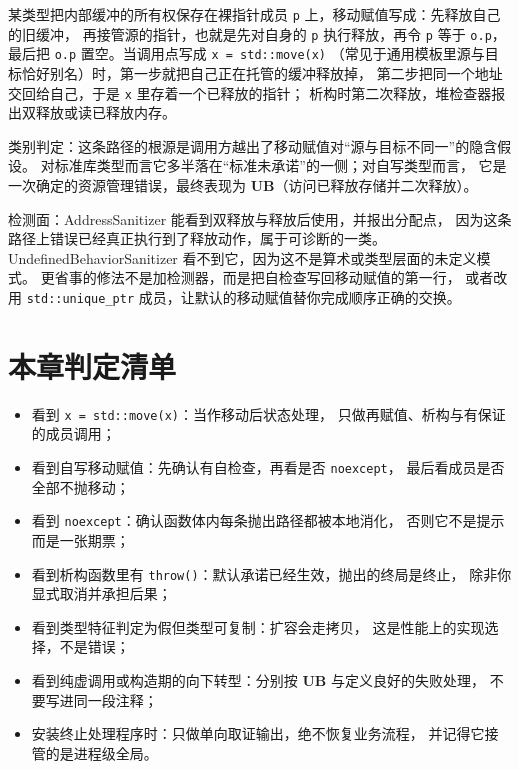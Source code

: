 \documentclass[12pt,a4paper,fontset=fandol]{ctexbook}
\newcommand{\Fn}[1]{\texttt{#1()}}
\newcommand{\Tp}[1]{\texttt{#1}}
\newcommand{\Bk}{\discretionary{}{}{}}
\newcommand{\UB}{\textbf{\textsf{UB}}}
\begin{document}
\begin{casebox}[title={自写移动赋值漏掉自检查导致的双重释放}]
某类型把内部缓冲的所有权保存在裸指针成员 \Tp{p} 上，移动赋值写成：先释放自己的旧缓冲，
再接管源的指针，也就是先对自身的 \Tp{p} 执行释放，再令 \Tp{p} 等于 \Tp{o.p}，
最后把 \Tp{o.p} 置空。当调用点写成 \Tp{x = std::move(x)}
（常见于通用模板里源与目标恰好别名）时，第一步就把自己正在托管的缓冲释放掉，
第二步把同一个地址交回给自己，于是 \Tp{x} 里存着一个已释放的指针；
析构时第二次释放，堆检查器报出双释放或读已释放内存。

类别判定：这条路径的根源是调用方越出了移动赋值对“源与目标不同一”的隐含假设。
对标准库类型而言它多半落在“标准未承诺”的一侧；对自写类型而言，
它是一次确定的资源管理错误，最终表现为 \UB{}（访问已释放存储并二次释放）。

检测面：AddressSanitizer 能看到双释放与释放后使用，并报出分配点，
因为这条路径上错误已经真正执行到了释放动作，属于可诊断的一类。
UndefinedBehaviorSanitizer 看不到它，因为这不是算术或类型层面的未定义模式。
更省事的修法不是加检测器，而是把自检查写回移动赋值的第一行，
或者改用 \Tp{std::unique{\Bk}\_ptr} 成员，让默认的移动赋值替你完成顺序正确的交换。
\end{casebox}

\section{本章判定清单}\label{sec:ub11-checklist}

\begin{itemize}
  \item 看到 \Tp{x = std::move(x)}：当作移动后状态处理，
        只做再赋值、析构与有保证的成员调用；
  \item 看到自写移动赋值：先确认有自检查，再看是否 \Tp{noexcept}，
        最后看成员是否全部不抛移动；
  \item 看到 \Tp{noexcept}：确认函数体内每条抛出路径都被本地消化，
        否则它不是提示而是一张期票；
  \item 看到析构函数里有 \Fn{throw}：默认承诺已经生效，抛出的终局是终止，
        除非你显式取消并承担后果；
  \item 看到类型特征判定为假但类型可复制：扩容会走拷贝，
        这是性能上的实现选择，不是错误；
  \item 看到纯虚调用或构造期的向下转型：分别按 \UB{} 与定义良好的失败处理，
        不要写进同一段注释；
  \item 安装终止处理程序时：只做单向取证输出，绝不恢复业务流程，
        并记得它接管的是进程级全局。
\end{itemize}
\end{document}
